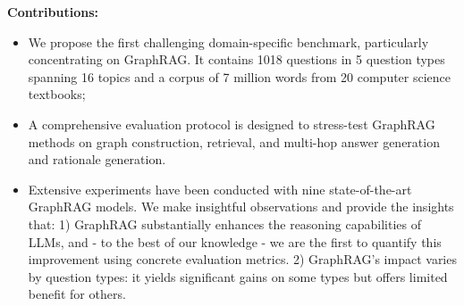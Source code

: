 \documentclass{article}
\begin{document}
\textbf{Contributions:}
\begin{itemize}[leftmargin=*]
    \item We propose the first challenging domain-specific benchmark, particularly concentrating on GraphRAG. It contains 1018 questions in 5 question types spanning 16 topics and a corpus of 7 million words from 20 computer science textbooks;
    \item A comprehensive evaluation protocol is designed to stress-test GraphRAG methods on graph construction, retrieval, and multi-hop answer generation and rationale generation.
    \item Extensive experiments have been conducted with nine state-of-the-art GraphRAG models. We make insightful observations and provide the insights that: 1) GraphRAG substantially enhances the reasoning capabilities of LLMs, and - to the best of our knowledge - we are the first to quantify this improvement using concrete evaluation metrics.  2) GraphRAG’s impact varies by question types: it yields significant gains on some types but offers limited benefit for others.
\end{itemize}
\end{document}
